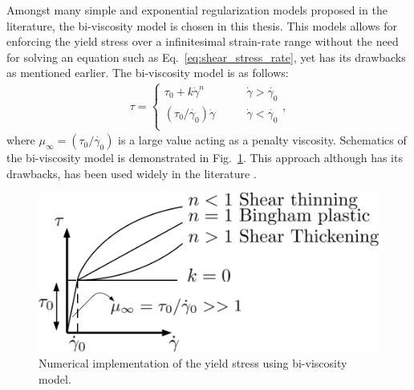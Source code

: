 Amongst many simple and exponential regularization models proposed in the literature, the bi-viscosity model is chosen in this thesis. This models allows for enforcing the yield stress over a infinitesimal strain-rate range without the need for solving an equation such as Eq.~\ref{eq:shear_stress_rate}, yet has its drawbacks as mentioned earlier. The bi-viscosity model is as follows:
\begin{align}
\tau=
\begin{cases}
\tau_0+ k \dot{\gamma}^n \qquad & \dot{\gamma}>\dot{\gamma_0}\\
(\tau_0/\dot{\gamma_0})\dot{\gamma}\qquad&  \dot{\gamma}<\dot{\gamma_0}\\
\end{cases},
\end{align}
where $\mu_{\infty}=(\tau_0/\dot{\gamma_0})$ is a large value acting as a penalty viscosity. Schematics of the bi-viscosity model is demonstrated in Fig.~\ref{fig:biviscosity}. This approach although has its drawbacks, has been used widely in the literature \cite{ragui2018progress,tanner1983numerical}.
\begin{figure}[H]
	\begin{center}
		\includegraphics[width=.6\linewidth]{images/Non-newtonian-Biviscosity.png}
	\end{center}
	\caption{Numerical implementation of the yield stress using bi-viscosity model.}
	\label{fig:biviscosity}
\end{figure}

